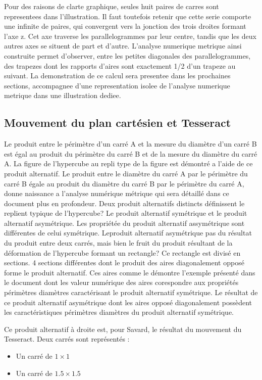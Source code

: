 \documentclass[a4paper,11pt]{article}
\newenvironment{mydef}[1]{%
    \begin{tcolorbox}[colback=blue!5,colframe=holblue,title={\textbf{Définition : #1}}]
}{%
    \end{tcolorbox}
}
\newenvironment{resume}{%
    \begin{tcolorbox}[colback=purple!5,colframe=holpurple,title={\textbf{Résumé visuel}}]
}{%
    \end{tcolorbox}
}
\begin{document}
\begin{resume}
Pour des raisons de clarte graphique, seules huit paires de carres sont representees dans l'illustration. Il faut toutefois retenir que cette serie comporte une infinite de paires, qui convergent vers la jonction des trois droites formant l'axe z. Cet axe traverse les parallelogrammes par leur centre, tandis que les deux autres axes se situent de part et d'autre. L'analyse numerique metrique ainsi construite permet d'observer, entre les petites diagonales des parallelogrammes, des trapezes dont les rapports d'aires sont exactement 1/2 d'un trapeze au suivant. La demonstration de ce calcul sera presentee dans les prochaines sections, accompagnee d'une representation isolee de l'analyse numerique metrique dans une illustration dediee.
\end{resume}

\subsection{Mouvement du plan cartésien et Tesseract}

Le produit entre le périmètre d'un carré A et la mesure du diamètre d'un carré B est égal au produit du périmètre du carré B et de la mesure du diamètre du carré A. La figure de l'hypercube au repli type de la figure est démontré a l'aide de ce produit alternatif.
Le produit entre le diamètre du carré A par le périmètre du carré B égale au produit du diamètre du carré B par le périmètre du carré A, donne naissance a l'analyse numérique métrique qui sera détaillé dans ce document plus en profondeur. Deux produit alternatifs distincts
définissent le replient typique de l'hypercube? Le produit alternatif symétrique et le produit alternatif asymétrique. Les propriétée du produit alternatif assymétrique sont différentes de celui symétrique. Leproduit alternatif asymétrique pas du résultat du produit entre deux carrés,
mais bien le fruit du produit résultant de la déformation de l'hypercube formant un rectangle? Ce rectangle est divisé en sections. 4 sections différentes dont le produit des aires diagonalement opposé forme le produit alternatif. Ces aires comme le démontre l'exemple présenté dans le
document dont les valeur numérique des aires corespondre aux propriétés périmètres diamètres caractérisant le produit alternatif symétrique. Le résultat de ce produit alternatif asymétrique dont les aires opposé diagonalement possèdent les caractéristiques périmètres diamètres 
du produit alternatif symétrique. 

\begin{mydef}{Produit alternatif}
Ce produit alternatif à droite est, pour Savard, le résultat du mouvement du Tesseract. Deux carrés sont représentés :
\begin{itemize}
    \item Un carré de $1 \times 1$
    \item Un carré de $1.5 \times 1.5$
\end{itemize}
\end{mydef}
\end{document}
